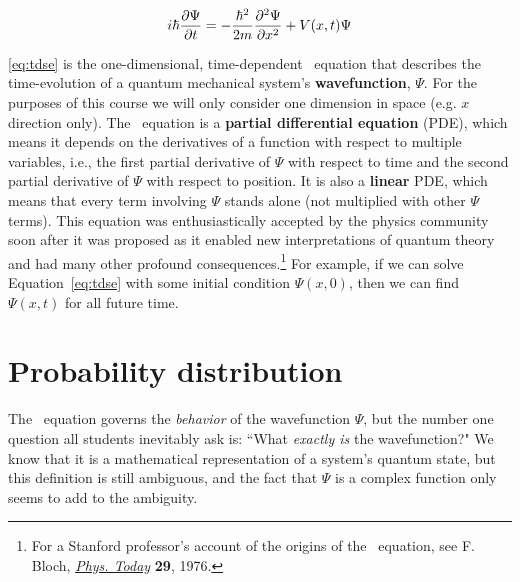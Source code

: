 \begin{tcolorbox}[title=Time-dependent \Sch\ equation] \vspace{-2ex}
	\begin{equation}
		i\hbar \pdv{\Psi}{t} = -\frac{\hbar^2}{2m} \pdv[2]{\Psi}{x} + V(x,t)\Psi \label{eq:tdse}
	\end{equation}
\end{tcolorbox}

\autoref{eq:tdse} is the one-dimensional, time-dependent \Sch\ equation that describes the time-evolution of a quantum mechanical system's \textbf{wavefunction}, $\Psi$. 
For the purposes of this course we will only consider one dimension in space (e.g. $x$ direction only). 
The \Sch\ equation is a \textbf{partial differential equation} (PDE), which means it depends on the derivatives of a function with respect to multiple variables, i.e., the first partial derivative of $\Psi$ with respect to time and the second partial derivative of $\Psi$ with respect to position. 
It is also a \textbf{linear} PDE, which means that every term involving $\Psi$ stands alone (not multiplied with other $\Psi$ terms).
This equation was enthusiastically accepted by the physics community soon after it was proposed as it enabled new interpretations of quantum theory and had many other profound consequences.\footnote{For a Stanford professor's account of the origins of the \Sch\ equation, see F. Bloch, \href{http://physicstoday.scitation.org/doi/pdf/10.1063/1.3024633}{\emph{Phys. Today}} \textbf{29}, 1976.} 
For example, if we can solve Equation~\ref{eq:tdse} with some initial condition $\Psi(x,0)$, then we can find $\Psi(x,t)$ for all future time.


\section{Probability distribution} \label{sec:prob}

The \Sch\ equation governs the \emph{behavior} of the wavefunction $\Psi$, but the number one question all students inevitably ask is: ``What \emph{exactly is} the wavefunction?" 
We know that it is a mathematical representation of a system's quantum state, but this definition is still ambiguous, and the fact that $\Psi$ is a complex function only seems to add to the ambiguity. 

